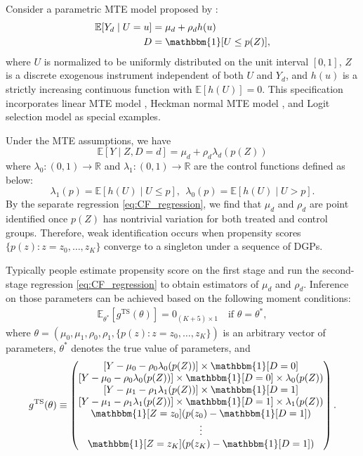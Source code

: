 \documentclass[11pt]{article}
\theoremstyle{definition}
\newcommand{\R}{\ensuremath{\mathbb{R}}}
\newcommand{\Exp}{\ensuremath{\mathbb{E}}} %
\newcommand{\0}{\ensuremath{\mathbf{0}}}
\newcommand{\indicator}{\ensuremath{\mathbbm{1}}}
\begin{document}
\begin{bibunit}
Consider a parametric MTE model proposed by \cite{kline/walters:2019}:
\begin{align*}
    \Exp[Y_d\mid U = u] &= \mu_d + \rho_d h(u) \\
    D &= \indicator[U \leq p(Z)],
\end{align*}
where $U$ is normalized to be uniformly distributed on the unit interval $[0,1]$, $Z$ is a discrete exogenous instrument independent of both $U$ and $Y_d$, and $h(u)$ is a strictly increasing continuous function with $\Exp[h(U)] = 0$. This specification incorporates  linear MTE model \citep{brinch/mogstad/wiswall:2017}, Heckman normal MTE model \citep{bjorklund/moffitt:1987}, and Logit selection model \citep{dubin/mcfadden:1984} as special examples. 

Under the MTE assumptions, we have 
\begin{equation}
\label{eq:CF_regression}
    \Exp[Y\mid Z, D=d] = \mu_d + \rho_d\lambda_d(p(Z))
\end{equation}
where $\lambda_0: (0,1)\to\R$ and $\lambda_1: (0,1)\to\R$ are the control functions defined as below:
\[
    \lambda_1(p) = \Exp[h(U)\mid U \leq p], ~~
    \lambda_0(p) = \Exp[h(U)\mid U > p].
\]
By the separate regression \eqref{eq:CF_regression}, we find that $\mu_d$ and $\rho_d$ are point identified once $p(Z)$ has nontrivial variation for both treated and control groups. Therefore, weak identification occurs when propensity scores $\{p(z): z = z_0,\ldots,z_K\}$ converge to a singleton under a sequence of DGPs.

Typically people estimate propensity score on the first stage and run the second-stage regression \eqref{eq:CF_regression} to obtain estimators of $\mu_d$ and $\rho_d$. Inference on those parameters can be achieved based on the following moment conditions:
\begin{align*}
    \Exp_{\theta^*}[g^{\text{TS}}(\theta)] = 
    0_{(K+5)\times 1} \quad \text{if~} \theta = \theta^*,
\end{align*}
where $\theta = (\mu_0, \mu_1, \rho_0, \rho_1, \{p(z): z = z_0, \ldots, z_K\})$ is an arbitrary vector of parameters, $\theta^*$ denotes the true value of parameters, and 
\begin{equation}
\label{eq:moment_two_stage}
    g^{\text{TS}}(\theta) \equiv 
    \begin{pmatrix}
        [Y - \mu_0 - \rho_0 \lambda_0(p(Z))] \times \indicator[D=0]\\
        [Y - \mu_0 - \rho_0 \lambda_0(p(Z))] \times \indicator[D=0] \times \lambda_0(p(Z)) \\
        [Y - \mu_1 - \rho_1 \lambda_1(p(Z))] \times \indicator[D=1] \\
        [Y - \mu_1 - \rho_1 \lambda_1(p(Z))] \times \indicator[D=1] \times \lambda_1(p(Z)) \\
        \indicator[Z=z_0] (p(z_0) - \indicator[D=1]) \\
        \vdots \\
        \indicator[Z=z_K] (p(z_K) - \indicator[D=1])
    \end{pmatrix}.
\end{equation}


\end{bibunit}
\end{document}
